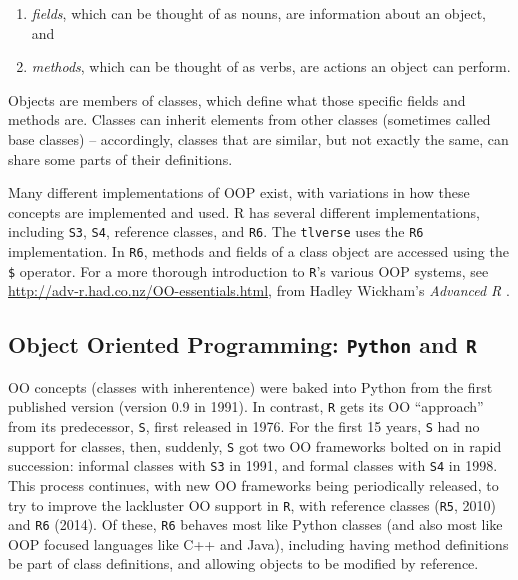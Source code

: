 \documentclass[12pt, krantz2,]{krantz}
\providecommand{\tightlist}{%
  \setlength{\itemsep}{0pt}\setlength{\parskip}{0pt}}
\theoremstyle{definition}
\theoremstyle{definition}
\theoremstyle{definition}
\newcommand{\1}{\mathbbm{1}}
\begin{document}
\begin{enumerate}
\def\labelenumi{\arabic{enumi}.}
\tightlist
\item
  \emph{fields}, which can be thought of as nouns, are information about an object,
  and
\item
  \emph{methods}, which can be thought of as verbs, are actions an object can
  perform.
\end{enumerate}

Objects are members of classes, which define what those specific fields and
methods are. Classes can inherit elements from other classes (sometimes called
base classes) -- accordingly, classes that are similar, but not exactly the
same, can share some parts of their definitions.

Many different implementations of OOP exist, with variations in how these
concepts are implemented and used. R has several different implementations,
including \texttt{S3}, \texttt{S4}, reference classes, and \texttt{R6}. The \texttt{tlverse} uses the \texttt{R6}
implementation. In \texttt{R6}, methods and fields of a class object are accessed using
the \texttt{\$} operator. For a more thorough introduction to \texttt{R}'s various OOP systems,
see \url{http://adv-r.had.co.nz/OO-essentials.html}, from Hadley Wickham's \emph{Advanced
R} \citep{wickham2014advanced}.

\hypertarget{object-oriented-programming-python-and-r}{%
\subsection{\texorpdfstring{Object Oriented Programming: \texttt{Python} and \texttt{R}}{Object Oriented Programming: Python and R}}\label{object-oriented-programming-python-and-r}}

OO concepts (classes with inherentence) were baked into Python from the first
published version (version 0.9 in 1991). In contrast, \texttt{R} gets its OO ``approach''
from its predecessor, \texttt{S}, first released in 1976. For the first 15 years, \texttt{S}
had no support for classes, then, suddenly, \texttt{S} got two OO frameworks bolted on
in rapid succession: informal classes with \texttt{S3} in 1991, and formal classes with
\texttt{S4} in 1998. This process continues, with new OO frameworks being periodically
released, to try to improve the lackluster OO support in \texttt{R}, with reference
classes (\texttt{R5}, 2010) and \texttt{R6} (2014). Of these, \texttt{R6} behaves most like Python
classes (and also most like OOP focused languages like C++ and Java), including
having method definitions be part of class definitions, and allowing objects to
be modified by reference.



\backmatter
\printindex
\end{document}
